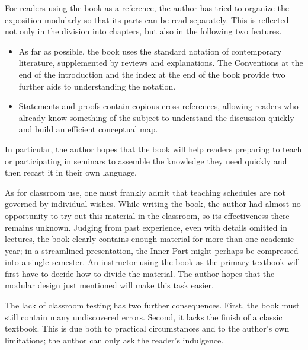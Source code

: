 For readers using the book as a reference, the author has tried to organize the exposition modularly so that its parts can be read separately. This is reflected not only in the division into chapters, but also in the following two features.
\begin{itemize}
	\item As far as possible, the book uses the standard notation of contemporary literature, supplemented by reviews and explanations. The Conventions at the end of the introduction and the index at the end of the book provide two further aids to understanding the notation.
	\item Statements and proofs contain copious cross-references, allowing readers who already know something of the subject to understand the discussion quickly and build an efficient conceptual map.
\end{itemize}

In particular, the author hopes that the book will help readers preparing to teach or participating in seminars to assemble the knowledge they need quickly and then recast it in their own language.

As for classroom use, one must frankly admit that teaching schedules are not governed by individual wishes. While writing the book, the author had almost no opportunity to try out this material in the classroom, so its effectiveness there remains unknown. Judging from past experience, even with details omitted in lectures, the book clearly contains enough material for more than one academic year; in a streamlined presentation, the Inner Part might perhaps be compressed into a single semester. An instructor using the book as the primary textbook will first have to decide how to divide the material. The author hopes that the modular design just mentioned will make this task easier.

The lack of classroom testing has two further consequences. First, the book must still contain many undiscovered errors. Second, it lacks the finish of a classic textbook. This is due both to practical circumstances and to the author's own limitations; the author can only ask the reader's indulgence.

